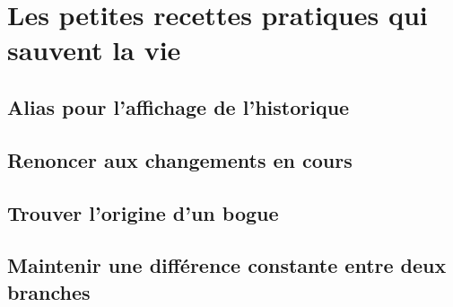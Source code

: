 \chapter{Les petites recettes pratiques qui sauvent la vie}\label{chapRecettes} %


\section{Alias pour l'affichage de l'historique} %

\section{Renoncer aux changements en cours} %

\section{Trouver l'origine d'un bogue} %

\section{Maintenir une différence constante entre deux branches} %


